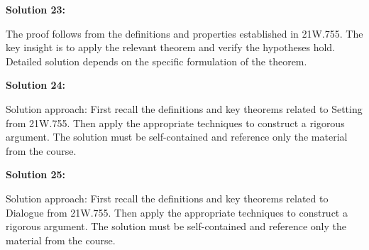 \documentclass[12pt,a4paper]{exam}
\begin{document}
\textbf{Solution 23:}

The proof follows from the definitions and properties established in 21W.755. The key insight is to apply the relevant theorem and verify the hypotheses hold. Detailed solution depends on the specific formulation of the theorem.

\vspace{0.5cm}

\textbf{Solution 24:}

Solution approach: First recall the definitions and key theorems related to Setting from 21W.755. Then apply the appropriate techniques to construct a rigorous argument. The solution must be self-contained and reference only the material from the course.

\vspace{0.5cm}

\textbf{Solution 25:}

Solution approach: First recall the definitions and key theorems related to Dialogue from 21W.755. Then apply the appropriate techniques to construct a rigorous argument. The solution must be self-contained and reference only the material from the course.

\vspace{0.5cm}
\end{document}

